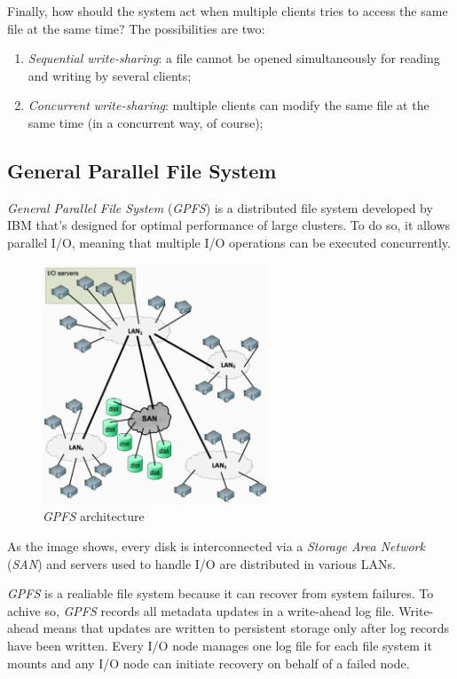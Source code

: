 \noindent
Finally, how should the system act when multiple clients tries to access the
same file at the same time? The possibilities are two:
\begin{enumerate}
    \item \emph{Sequential write-sharing}: a file cannot be opened simultaneously
    for reading and writing by several clients;
    \item \emph{Concurrent write-sharing}: multiple clients can modify the same
    file at the same time (in a concurrent way, of course);
\end{enumerate}

\subsection{General Parallel File System}
\emph{General Parallel File System} (\emph{GPFS}) is a distributed file
system developed by IBM that's designed for optimal performance of large
clusters. To do so, it allows parallel I/O, meaning that multiple I/O
operations can be executed concurrently.

\begin{figure}[h!]
    \centering
    \includegraphics[width=0.6\textwidth]{images/gpfs-design.png}
    \caption{\emph{GPFS} architecture}
\end{figure}

\noindent
As the image shows, every disk is interconnected via a \emph{Storage Area Network}
(\emph{SAN}) and servers used to handle I/O are distributed in various LANs.

\emph{GPFS} is a realiable file system because it can recover from system
failures. To achive so, \emph{GPFS} records all metadata updates in a write-ahead
log file. Write-ahead means that updates are written to persistent storage only
after log records have been written. Every I/O node manages one log file for
each file system it mounts and any I/O node can initiate recovery on behalf of
a failed node.


